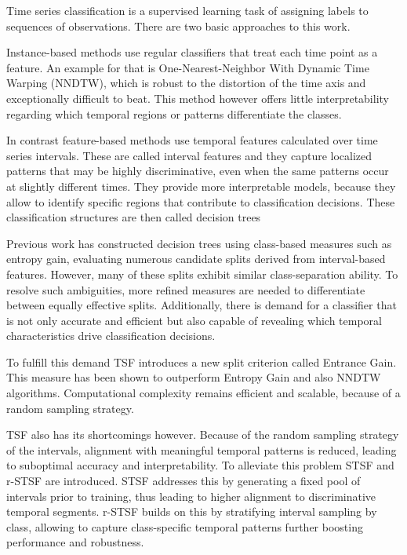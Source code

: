 \par Time series classification is a supervised learning task of 
assigning labels to sequences of observations. There are two 
basic approaches to this work. 

Instance-based methods use regular classifiers that treat each time point
as a feature. An example for that is One-Nearest-Neighbor With Dynamic Time Warping 
(NNDTW), which is robust to the distortion of the time axis and exceptionally difficult to beat. %
This method however offers little interpretability 
regarding which temporal regions or patterns differentiate the classes.

In contrast feature-based methods use temporal features calculated over time series intervals. %
These are called interval features and they capture localized patterns that may be highly 
discriminative, even when the same patterns occur at slightly different times. They provide 
more interpretable models, because they allow to identify specific regions that contribute to classification decisions.
These classification structures are then called decision trees

Previous work has constructed decision trees using class-based measures such as entropy gain, evaluating
numerous candidate splits derived from interval-based features. However, many of these splits exhibit 
similar class-separation ability. To resolve such ambiguities, more refined measures are needed to 
differentiate between equally effective splits. Additionally, there is demand for a classifier 
that is not only accurate and efficient but also capable of revealing which temporal characteristics 
drive classification decisions.

To fulfill this demand TSF introduces a new split criterion called Entrance Gain. 
This measure has been shown to outperform Entropy Gain and also NNDTW algorithms. 
Computational complexity remains efficient and scalable, because of a random sampling
strategy.

TSF also has its shortcomings however. Because of the random sampling strategy of the intervals,
alignment with meaningful temporal patterns is reduced, leading to suboptimal accuracy and interpretability.
To alleviate this problem STSF and r-STSF are introduced. STSF addresses this by generating a fixed pool of 
intervals prior to training, thus leading to higher alignment to discriminative temporal segments.
r-STSF builds on this by stratifying interval sampling by class, allowing to capture class-specific
temporal patterns further boosting performance and robustness.
